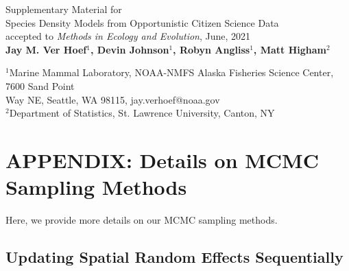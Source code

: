 \documentclass[11pt, titlepage]{article}
\begin{document}

\begin{flushleft}
\setcounter{equation}{0}
\renewcommand{\theequation}{A.\arabic{equation}}
\setcounter{figure}{0}

\begin{onehalfspace}
\begin{center}
Supplementary Material for \\ {\Large Species Density Models from Opportunistic Citizen Science Data} \\
accepted to \emph{Methods in Ecology and Evolution}, June, 2021 \\
\vspace{.3cm}
\textbf{Jay M. Ver Hoef$^1$, Devin Johnson$^1$, Robyn Angliss$^1$, Matt Higham$^2$}  \\
\end{center}
\vspace{.3cm}
$^1$Marine Mammal Laboratory, NOAA-NMFS Alaska Fisheries Science Center, 7600 Sand Point \\
\hspace{.5cm} Way NE, Seattle, WA 98115, jay.verhoef@noaa.gov \\
$^2$Department of Statistics, St. Lawrence University, Canton, NY 


\section*{APPENDIX: Details on MCMC Sampling Methods} \label{app:MCMCmeth}

Here, we provide more details on our MCMC sampling methods.


\subsection*{Updating Spatial Random Effects Sequentially}


\end{onehalfspace}
\end{flushleft}
\end{document}
